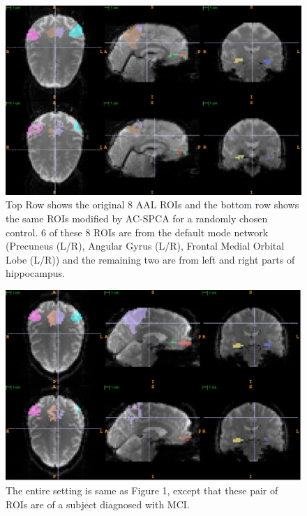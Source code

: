 \documentclass{article}
\begin{document}
\begin{figure}
\begin{center}
\includegraphics[width=1\linewidth]{aalvspca_control101.pdf} 
\end{center}
\vspace{-0.3in}
\caption{Top Row shows the original  8 AAL ROIs and the bottom row shows the same ROIs modified by AC-SPCA for a randomly chosen control. 6 of these 8 ROIs are from the default mode network (Precuneus (L/R), Angular Gyrus (L/R), Frontal Medial Orbital Lobe (L/R)) and the remaining two are from left and right parts of hippocampus. }
\label{fig:priorcontrol}
\end{figure}

\begin{figure}
\begin{center}
\includegraphics[width=01\linewidth]{aalvspca_mci220.pdf} 
\end{center}
\vspace{-0.3in}
\caption{The entire setting is same as Figure 1, except that these pair of ROIs are of a subject diagnosed with MCI.}
\label{fig:priormci}
\end{figure}
\end{document}
